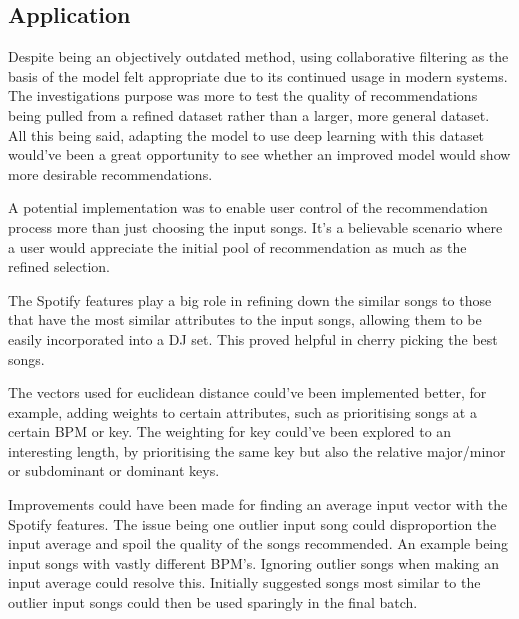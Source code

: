 \subsection{Application}
Despite being an objectively outdated method, using collaborative filtering as the basis of the model felt appropriate due to its continued usage in modern systems. The investigations purpose was more to test the quality of recommendations being pulled from a refined dataset rather than a larger, more general dataset. All this being said, adapting the model to use deep learning with this dataset would've been a great opportunity to see whether an improved model would show more desirable recommendations.

A potential implementation was to enable user control of the recommendation process more than just choosing the input songs. It's a believable scenario where a user would appreciate the initial pool of recommendation as much as the refined selection.

The Spotify features play a big role in refining down the similar songs to those that have the most similar attributes to the input songs, allowing them to be easily incorporated into a DJ set. This proved helpful in cherry picking the best songs. 

The vectors used for euclidean distance could've been implemented better, for example, adding weights to certain attributes, such as prioritising songs at a certain BPM or key. The weighting for key could've been explored to an interesting length, by prioritising the same key but also the relative major/minor or subdominant or dominant keys.

Improvements could have been made for finding an average input vector with the Spotify features. The issue being one outlier input song could disproportion the input average and spoil the quality of the songs recommended. An example being input songs with vastly different BPM's. Ignoring outlier songs when making an input average could resolve this. Initially suggested songs most similar to the outlier input songs could then be used sparingly in the final batch.

